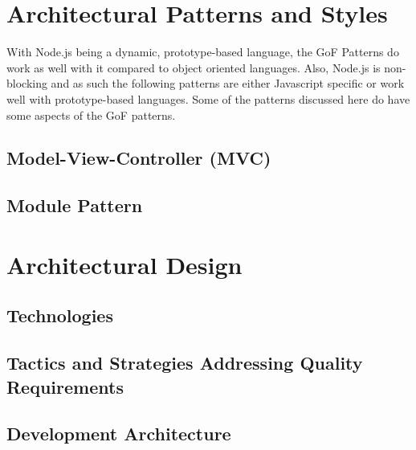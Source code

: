 \documentclass[a4paper,12pt,titlepage]{article}
\begin{document}


\section{Architectural Patterns and Styles}
With Node.js being a dynamic, prototype-based language, the GoF Patterns do work as well with it compared to object oriented languages. Also, Node.js is non-blocking and as such the following patterns are either Javascript specific or work well with prototype-based languages. Some of the patterns discussed here do have some aspects of the GoF patterns.
	\subsection{Model-View-Controller (MVC)}
	
	
	\subsection{Module Pattern}
		
	
\section{Architectural Design}	
	\subsection{Technologies}
		
	\subsection{Tactics and Strategies Addressing Quality Requirements}
		
	\subsection{Development Architecture}
			
	
\end{document}
